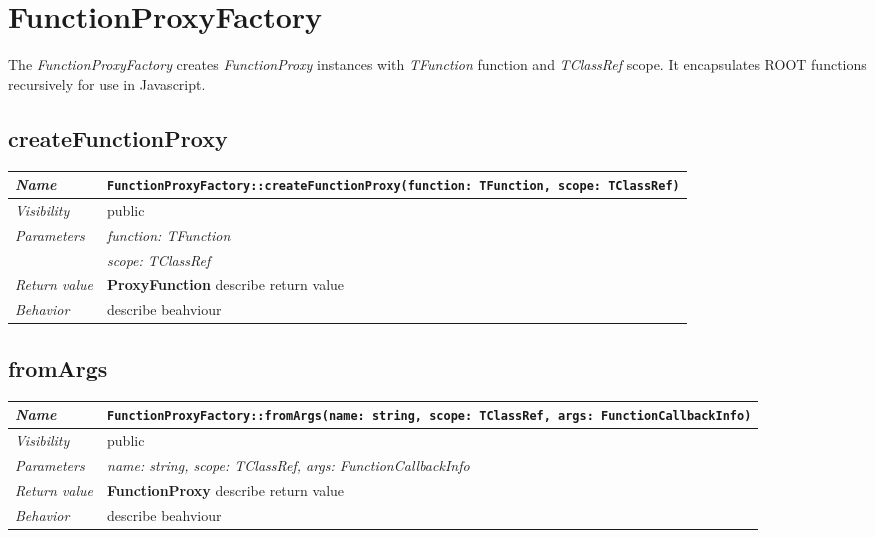 \chapter{FunctionProxyFactory}
The \textit{FunctionProxyFactory} creates \textit{FunctionProxy} instances with \textit{TFunction} function and \textit{TClassRef} scope. It encapsulates ROOT functions recursively for use in Javascript. 
\section{createFunctionProxy}
\begin{longtable}{p{3cm} @{\hskip 1cm} p{12cm}}
 \hline
\textit{Name} & \texttt{FunctionProxyFactory::createFunctionProxy(function: TFunction, scope: TClassRef)}\\
\hline
 \textit{Visibility} & public\\
\hline
\textit{Parameters} & \textit{function: TFunction} \\ 
& \textit{scope: TClassRef}\\
\hline
\textit{Return value} & \textbf{ProxyFunction} describe return value\\
  \hline
 \textit{Behavior} & describe beahviour \\
\hline
\end{longtable} \pagebreak
 \section{fromArgs}
\begin{longtable}{p{3cm} @{\hskip 1cm} p{12cm}}
 \hline	
\textit{Name} & \texttt{FunctionProxyFactory::fromArgs(name: string, scope: TClassRef, args: FunctionCallbackInfo)}\\
\hline
 \textit{Visibility} & public\\
\hline
\textit{Parameters} & \textit{name: string, scope: TClassRef, args: FunctionCallbackInfo}\\
\hline
\textit{Return value} & \textbf{ FunctionProxy} describe return value\\
  \hline
 \textit{Behavior} & describe beahviour \\
\hline
\end{longtable} \pagebreak
 